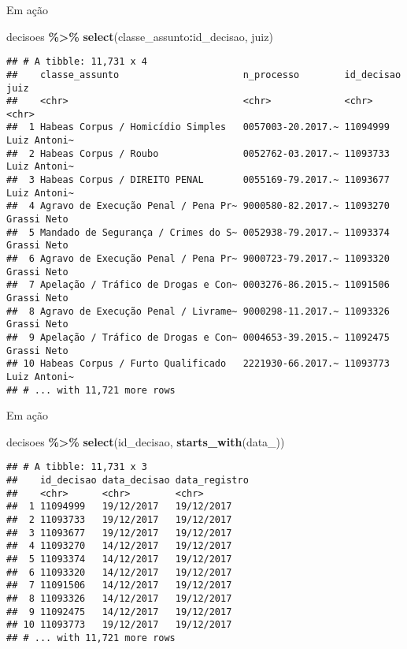 \documentclass[
  10pt,
  ignorenonframetext,
]{beamer}
\newenvironment{Shaded}{\begin{snugshade}}{\end{snugshade}}
\newcommand{\KeywordTok}[1]{\textcolor[rgb]{0.13,0.29,0.53}{\textbf{#1}}}
\newcommand{\NormalTok}[1]{#1}
\newcommand{\OperatorTok}[1]{\textcolor[rgb]{0.81,0.36,0.00}{\textbf{#1}}}
\newcommand{\StringTok}[1]{\textcolor[rgb]{0.31,0.60,0.02}{#1}}
\begin{document}
\begin{frame}[fragile]{Em ação}
\protect\hypertarget{em-auxe7uxe3o-1}{}
\begin{Shaded}
\begin{Highlighting}[]
\NormalTok{decisoes }\OperatorTok{\%\textgreater{}\%}\StringTok{ }
\StringTok{  }\KeywordTok{select}\NormalTok{(classe\_assunto}\OperatorTok{:}\NormalTok{id\_decisao, juiz)}
\end{Highlighting}
\end{Shaded}

\begin{verbatim}
## # A tibble: 11,731 x 4
##    classe_assunto                      n_processo        id_decisao juiz        
##    <chr>                               <chr>             <chr>      <chr>       
##  1 Habeas Corpus / Homicídio Simples   0057003-20.2017.~ 11094999   Luiz Antoni~
##  2 Habeas Corpus / Roubo               0052762-03.2017.~ 11093733   Luiz Antoni~
##  3 Habeas Corpus / DIREITO PENAL       0055169-79.2017.~ 11093677   Luiz Antoni~
##  4 Agravo de Execução Penal / Pena Pr~ 9000580-82.2017.~ 11093270   Grassi Neto 
##  5 Mandado de Segurança / Crimes do S~ 0052938-79.2017.~ 11093374   Grassi Neto 
##  6 Agravo de Execução Penal / Pena Pr~ 9000723-79.2017.~ 11093320   Grassi Neto 
##  7 Apelação / Tráfico de Drogas e Con~ 0003276-86.2015.~ 11091506   Grassi Neto 
##  8 Agravo de Execução Penal / Livrame~ 9000298-11.2017.~ 11093326   Grassi Neto 
##  9 Apelação / Tráfico de Drogas e Con~ 0004653-39.2015.~ 11092475   Grassi Neto 
## 10 Habeas Corpus / Furto Qualificado   2221930-66.2017.~ 11093773   Luiz Antoni~
## # ... with 11,721 more rows
\end{verbatim}
\end{frame}

\begin{frame}[fragile]{Em ação}
\protect\hypertarget{em-auxe7uxe3o-2}{}
\begin{Shaded}
\begin{Highlighting}[]
\NormalTok{decisoes }\OperatorTok{\%\textgreater{}\%}\StringTok{ }
\StringTok{  }\KeywordTok{select}\NormalTok{(id\_decisao, }\KeywordTok{starts\_with}\NormalTok{(}\StringTok{\textquotesingle{}data\_\textquotesingle{}}\NormalTok{))}
\end{Highlighting}
\end{Shaded}

\begin{verbatim}
## # A tibble: 11,731 x 3
##    id_decisao data_decisao data_registro
##    <chr>      <chr>        <chr>        
##  1 11094999   19/12/2017   19/12/2017   
##  2 11093733   19/12/2017   19/12/2017   
##  3 11093677   19/12/2017   19/12/2017   
##  4 11093270   14/12/2017   19/12/2017   
##  5 11093374   14/12/2017   19/12/2017   
##  6 11093320   14/12/2017   19/12/2017   
##  7 11091506   14/12/2017   19/12/2017   
##  8 11093326   14/12/2017   19/12/2017   
##  9 11092475   14/12/2017   19/12/2017   
## 10 11093773   19/12/2017   19/12/2017   
## # ... with 11,721 more rows
\end{verbatim}
\end{frame}
\end{document}
